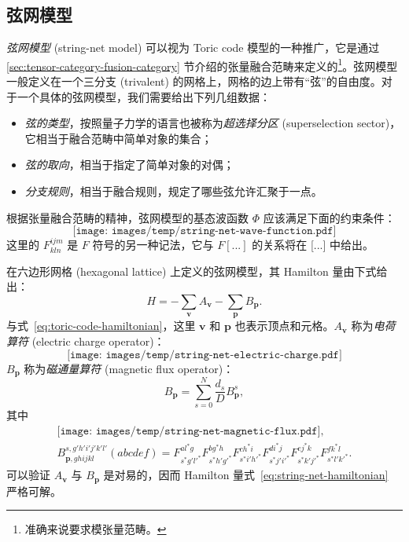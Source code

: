 \subsection{弦网模型}

\emph{弦网模型} (string-net model)\cite{levin2005string,levin2006detecting} 可以视为 Toric code 模型的一种推广，它是通过 \ref{sec:tensor-category-fusion-category} 节介绍的张量融合范畴来定义的\footnote{准确来说要求模张量范畴。}。弦网模型一般定义在一个三分支 (trivalent) 的网格上，网格的边上带有“弦”的自由度。对于一个具体的弦网模型，我们需要给出下列几组数据：
\begin{itemize}
  \item \emph{弦的类型}，按照量子力学的语言也被称为\emph{超选择分区} (superselection sector)，它相当于融合范畴中简单对象的集合；
  \item \emph{弦的取向}，相当于指定了简单对象的对偶；
  \item \emph{分支规则}，相当于融合规则，规定了哪些弦允许汇聚于一点。
\end{itemize}

根据张量融合范畴的精神，弦网模型的基态波函数 $\Phi$ 应该满足下面的约束条件：
\begin{equation}
  \texttt{[image: images/temp/string-net-wave-function.pdf]}
\end{equation}
这里的 $F^{ijm}_{kln}$ 是 $F$ 符号的另一种记法，它与 $F[...]$ 的关系将在 [...] 中给出。

在六边形网格 (hexagonal lattice) 上定义的弦网模型，其 Hamilton 量由下式给出：
\begin{equation}
  H = -\sum_\bm{v} A_\bm{v} - \sum_\bm{p} B_\bm{p}.
  \label{eq:string-net-hamiltonian}
\end{equation}
与式~\eqref{eq:toric-code-hamiltonian}，这里 $\bm{v}$ 和 $\bm{p}$ 也表示顶点和元格。$A_\bm{v}$ 称为\emph{电荷算符} (electric charge operator)：
\begin{equation}
  \texttt{[image: images/temp/string-net-electric-charge.pdf]}
\end{equation}
$B_\bm{p}$ 称为\emph{磁通量算符} (magnetic flux operator)：
\begin{equation}
  B_\bm{p} = \sum_{s=0}^N \frac{d_s}{D} B_\bm{p}^s,
\end{equation}
其中
\begin{equation}
  \begin{gathered}
    \texttt{[image: images/temp/string-net-magnetic-flux.pdf]}, \\
    B_{\bm{p},ghijkl}^{s,g'h'i'j'k'l'}(abcdef) =
      F^{al^*g}_{s^*g'l'^*}
      F^{bg^*h}_{s^*h'g'^*}
      F^{ch^*i}_{s^*i'h'^*}
      F^{di^*j}_{s^*j'i'^*}
      F^{ej^*k}_{s^*k'j'^*}
      F^{fk^*l}_{s^*l'k'^*}.
  \end{gathered}
\end{equation}
可以验证 $A_\bm{v}$ 与 $B_\bm{p}$ 是对易的，因而 Hamilton 量式~\eqref{eq:string-net-hamiltonian} 严格可解。
